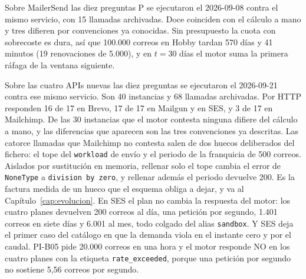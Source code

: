 Sobre MailerSend las diez preguntas P se ejecutaron el 2026-09-08 contra el mismo servicio, con 15 llamadas archivadas.
Doce coinciden con el cálculo a mano y tres difieren por convenciones ya conocidas.
Sin presupuesto la cuota con sobrecoste es dura, así que 100.000 correos en Hobby tardan 570 días y 41 minutos (19 renovaciones de 5.000), y en $t = 30$ días el motor suma la primera ráfaga de la ventana siguiente.

Sobre las cuatro APIs nuevas las diez preguntas se ejecutaron el 2026-09-21 contra ese mismo servicio.
Son 40 instancias y 68 llamadas archivadas.
Por HTTP responden 16 de 17 en Brevo, 17 de 17 en Mailgun y en SES, y 3 de 17 en Mailchimp.
De las 30 instancias que el motor contesta ninguna difiere del cálculo a mano, y las diferencias que aparecen son las tres convenciones ya descritas.
Las catorce llamadas que Mailchimp no contesta salen de dos huecos deliberados del fichero: el tope del \texttt{workload} de envío y el periodo de la franquicia de 500 correos.
Aislados por sustitución en memoria, rellenar solo el tope cambia el error de \texttt{NoneType} a \texttt{division by zero}, y rellenar además el periodo devuelve 200.
Es la factura medida de un hueco que el esquema obliga a dejar, y va al Capítulo~\ref{cap:evolucion}.
En SES el plan no cambia la respuesta del motor: los cuatro planes devuelven 200 correos al día, una petición por segundo, 1.401 correos en siete días y 6.001 al mes, todo colgado del alias \texttt{sandbox}.
Y SES deja el primer caso del catálogo en que la demanda viola en el instante cero y por el caudal.
PI-B05 pide 20.000 correos en una hora y el motor responde NO en los cuatro planes con la etiqueta \texttt{rate\_exceeded}, porque una petición por segundo no sostiene 5,56 correos por segundo.


